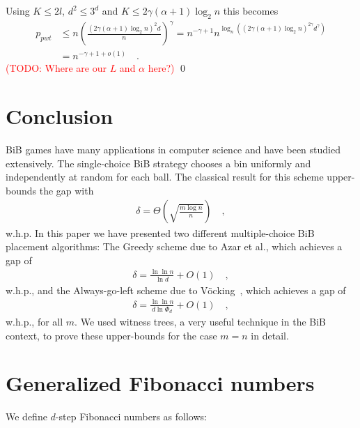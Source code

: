 \documentclass[a4paper,12pt]{article}
\newcommand\todo[1]{\textcolor{red}{(TODO: #1)}}
\begin{document}
Using $K \leq 2l$, $d^2 \leq 3^d$ and $K \leq 2\gamma  \left( \alpha +1 \right)  \log_2 n$ this becomes
\begin{align*}
p_{pwt} &\leq n \left(\frac{\left(2\gamma  \left(\alpha +1 \right)  \log_2 n\right)^2 d}{n}\right)^\gamma 
        = n^{-\gamma +1}  n ^{\log_n\left( \left(2\gamma \left(\alpha+1\right) \log_2n \right)^{2\gamma}  d^\gamma \right)} \\
        &= n^{-\gamma+1+o\left(1\right)} \quad .
\end{align*}
\todo{Where are our $L$ and $\alpha$ here?}
\qed
 
\section{Conclusion}
\label{sec:conclusion}
BiB games have many applications in computer science and have been studied extensively. The single-choice BiB strategy chooses a bin uniformly and independently at random for each ball. The classical result for this scheme upper-bounds the gap with~\cite{RS98}
\begin{align*}
\delta =  \Theta\left(\sqrt{\frac{m  \log n}{n}}\right) \quad ,
\end{align*}
w.h.p.
In this paper we have presented two different multiple-choice BiB placement algorithms: The Greedy scheme due to Azar et al.\cite{ABKU99}, which achieves a gap of 
\begin{align*}
\delta = \frac{\ln\ln n}{\ln d} + O(1) \quad ,
\end{align*}
w.h.p., and the Always-go-left scheme due to V\"ocking~\cite{VOC03}, which achieves a gap of
\begin{align*}
\delta = \frac{\ln \ln n}{d \ln \Phi_d} + O(1) \quad ,
\end{align*}
w.h.p., for all $m$. We used witness trees, a very useful technique in the BiB context, to prove these upper-bounds for the case $m=n$ in detail.

\appendix
\section{Generalized Fibonacci numbers}
\label{sec:fibonacci}
We define $d$-step Fibonacci numbers as follows:
\end{document}

